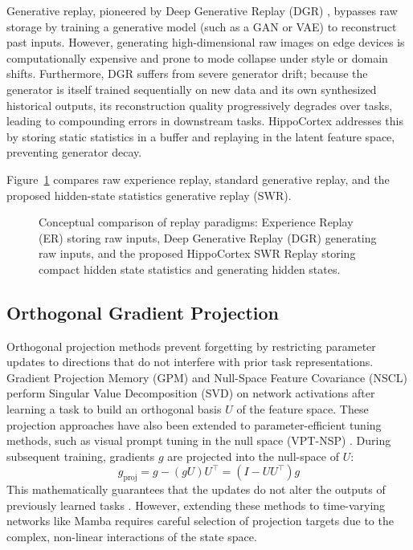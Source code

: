Generative replay, pioneered by Deep Generative Replay (DGR) \cite{shinContinualLearningDeep2017}, bypasses raw storage by training a generative model (such as a GAN or VAE) to reconstruct past inputs. However, generating high-dimensional raw images on edge devices is computationally expensive and prone to mode collapse under style or domain shifts. Furthermore, DGR suffers from severe generator drift; because the generator is itself trained sequentially on new data and its own synthesized historical outputs, its reconstruction quality progressively degrades over tasks, leading to compounding errors in downstream tasks. HippoCortex addresses this by storing static statistics in a buffer and replaying in the latent feature space, preventing generator decay.

Figure~\ref{fig:replay_comparison} compares raw experience replay, standard generative replay, and the proposed hidden-state statistics generative replay (SWR).

\begin{figure}[ht]
    \centering
    
    \caption{Conceptual comparison of replay paradigms: Experience Replay (ER) storing raw inputs, Deep Generative Replay (DGR) generating raw inputs, and the proposed HippoCortex SWR Replay storing compact hidden state statistics and generating hidden states.}
    \label{fig:replay_comparison}
\end{figure}

\subsection{Orthogonal Gradient Projection}
Orthogonal projection methods prevent forgetting by restricting parameter updates to directions that do not interfere with prior task representations. Gradient Projection Memory (GPM) \cite{sahaGradientProjectionMemory2021} and Null-Space Feature Covariance (NSCL) \cite{wangTrainingNetworksNull2021} perform Singular Value Decomposition (SVD) on network activations after learning a task to build an orthogonal basis $U$ of the feature space. These projection approaches have also been extended to parameter-efficient tuning methods, such as visual prompt tuning in the null space (VPT-NSP) \cite{luVisualPromptTuning}. During subsequent training, gradients $g$ are projected into the null-space of $U$:
\begin{equation}
    g_{\text{proj}} = g - (g U) U^\top = (I - U U^\top) g
    \label{eq:null_space_projection}
\end{equation}
This mathematically guarantees that the updates do not alter the outputs of previously learned tasks \cite{sahaGradientProjectionMemory2021}. However, extending these methods to time-varying networks like Mamba requires careful selection of projection targets due to the complex, non-linear interactions of the state space.

